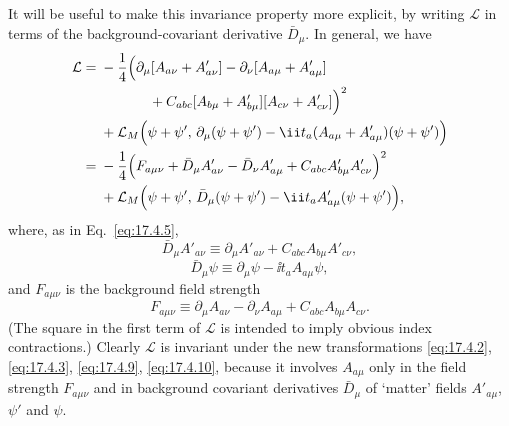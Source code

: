 It will be useful to make this invariance property more explicit, by writing
$\mathcal L$ in terms of the background-covariant derivative $\bar D_\mu$.
In general, we have
\begin{align}
\mathcal L={}&-\frac14\Bigl(
\partial_\mu[A_{a\nu}+A'_{a\nu}]
-\partial_\nu[A_{a\mu}+A'_{a\mu}]
\notag\\
&\hspace{3.5em}
+C_{abc}[A_{b\mu}+A'_{b\mu}]
[A_{c\nu}+A'_{c\nu}]\Bigr)^2
\notag\\
&+\mathcal L_M\Bigl(\psi+\psi',\,
\partial_\mu(\psi+\psi')
-\ii t_a(A_{a\mu}+A'_{a\mu})(\psi+\psi')\Bigr)
\notag\\
={}&-\frac14\Bigl(F_{a\mu\nu}
+\bar D_\mu A'_{a\nu}-\bar D_\nu A'_{a\mu}
+C_{abc}A'_{b\mu}A'_{c\nu}\Bigr)^2
\notag\\
&+\mathcal L_M\Bigl(\psi+\psi',\,
\bar D_\mu(\psi+\psi')-\ii t_a A'_{a\mu}(\psi+\psi')\Bigr),
\label{eq:17.4.12}
\end{align}
where, as in Eq.~\eqref{eq:17.4.5},
\begin{equation}
\bar D_\mu A'_{a\nu}\equiv
\partial_\mu A'_{a\nu}
+C_{abc}A_{b\mu}A'_{c\nu},
\label{eq:17.4.13}
\end{equation}
\begin{equation}
\bar D_\mu\psi\equiv\partial_\mu\psi-\ii t_a A_{a\mu}\psi,
\label{eq:17.4.14}
\end{equation}
and $F_{a\mu\nu}$ is the background field strength
\begin{equation}
F_{a\mu\nu}\equiv
\partial_\mu A_{a\nu}-\partial_\nu A_{a\mu}
+C_{abc}A_{b\mu}A_{c\nu}.
\label{eq:17.4.15}
\end{equation}
(The square in the first term of $\mathcal L$ is intended to imply obvious
index contractions.) Clearly $\mathcal L$ is invariant under the new
transformations \eqref{eq:17.4.2}, \eqref{eq:17.4.3},
\eqref{eq:17.4.9}, \eqref{eq:17.4.10}, because it involves
$A_{a\mu}$ only in the field strength $F_{a\mu\nu}$ and in
background covariant derivatives $\bar D_\mu$ of `matter' fields
$A'_{a\mu}$, $\psi'$ and $\psi$.

